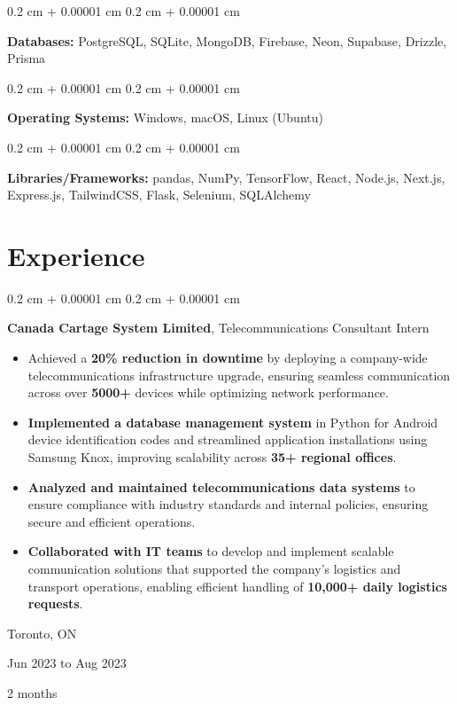 \documentclass[10pt, letterpaper]{article}
\newenvironment{highlights}{
    \begin{itemize}[
        topsep=0.10 cm,
        parsep=0.10 cm,
        partopsep=0pt,
        itemsep=0pt,
        leftmargin=0.4 cm + 10pt
    ]
}{
    \end{itemize}
} %
\newenvironment{onecolentry}{
    \begin{adjustwidth}{
        0.2 cm + 0.00001 cm
    }{
        0.2 cm + 0.00001 cm
    }
}{
    \end{adjustwidth}
} %
\newenvironment{twocolentry}[2][]{
    \onecolentry
    \def\secondColumn{#2}
    \setcolumnwidth{\fill, 2.5 cm}
    \begin{paracol}{2}
}{
    \switchcolumn \raggedleft \secondColumn
    \end{paracol}
    \endonecolentry
} %
\begin{document}
        \vspace{0.05 cm}

        \begin{onecolentry}
            \textbf{Databases:} PostgreSQL, SQLite, MongoDB, Firebase, Neon, Supabase, Drizzle, Prisma
        \end{onecolentry}

        \vspace{0.05 cm}

        \begin{onecolentry}
            \textbf{Operating Systems:} Windows, macOS, Linux (Ubuntu)
        \end{onecolentry}

        \vspace{0.05 cm}

        \begin{onecolentry}
            \textbf{Libraries/Frameworks:} pandas, NumPy, TensorFlow, React, Node.js, Next.js, Express.js, TailwindCSS, Flask, Selenium, SQLAlchemy
        \end{onecolentry}


    
    \section{Experience}



        
        \begin{twocolentry}{
            Toronto, ON

        Jun 2023 to Aug 2023

        2 months
        }
            \textbf{Canada Cartage System Limited}, Telecommunications Consultant Intern
            \begin{highlights}
                \item Achieved a \textbf{20\% reduction in downtime} by deploying a company-wide telecommunications infrastructure upgrade, ensuring seamless communication across over \textbf{5000+} devices while optimizing network performance.
                \item \textbf{Implemented a database management system} in Python for Android device identification codes and streamlined application installations using Samsung Knox, improving scalability across \textbf{35+ regional offices}.
                \item \textbf{Analyzed and maintained telecommunications data systems} to ensure compliance with industry standards and internal policies, ensuring secure and efficient operations.
                \item \textbf{Collaborated with IT teams} to develop and implement scalable communication solutions that supported the company’s logistics and transport operations, enabling efficient handling of \textbf{10,000+ daily logistics requests}.
            \end{highlights}
        \end{twocolentry}
\end{document}
